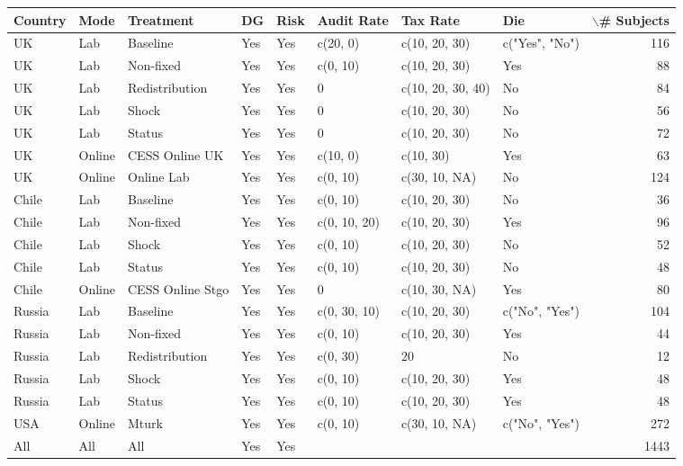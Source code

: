 \begin{tabular}{llllllllr}
  \hline
Country & Mode & Treatment & DG & Risk & Audit Rate & Tax Rate & Die & $\backslash$\# Subjects \\ 
  \hline
UK & Lab & Baseline & Yes & Yes & c(20, 0) & c(10, 20, 30) & c("Yes", "No") & 116 \\ 
  UK & Lab & Non-fixed & Yes & Yes & c(0, 10) & c(10, 20, 30) & Yes &  88 \\ 
  UK & Lab & Redistribution & Yes & Yes & 0 & c(10, 20, 30, 40) & No &  84 \\ 
  UK & Lab & Shock & Yes & Yes & 0 & c(10, 20, 30) & No &  56 \\ 
  UK & Lab & Status & Yes & Yes & 0 & c(10, 20, 30) & No &  72 \\ 
  UK & Online & CESS Online UK & Yes & Yes & c(10, 0) & c(10, 30) & Yes &  63 \\ 
  UK & Online & Online Lab & Yes & Yes & c(0, 10) & c(30, 10, NA) & No & 124 \\ 
  Chile & Lab & Baseline & Yes & Yes & c(0, 10) & c(10, 20, 30) & No &  36 \\ 
  Chile & Lab & Non-fixed & Yes & Yes & c(0, 10, 20) & c(10, 20, 30) & Yes &  96 \\ 
  Chile & Lab & Shock & Yes & Yes & c(0, 10) & c(10, 20, 30) & No &  52 \\ 
  Chile & Lab & Status & Yes & Yes & c(0, 10) & c(10, 20, 30) & No &  48 \\ 
  Chile & Online & CESS Online Stgo & Yes & Yes & 0 & c(10, 30, NA) & Yes &  80 \\ 
  Russia & Lab & Baseline & Yes & Yes & c(0, 30, 10) & c(10, 20, 30) & c("No", "Yes") & 104 \\ 
  Russia & Lab & Non-fixed & Yes & Yes & c(0, 10) & c(10, 20, 30) & Yes &  44 \\ 
  Russia & Lab & Redistribution & Yes & Yes & c(0, 30) & 20 & No &  12 \\ 
  Russia & Lab & Shock & Yes & Yes & c(0, 10) & c(10, 20, 30) & Yes &  48 \\ 
  Russia & Lab & Status & Yes & Yes & c(0, 10) & c(10, 20, 30) & Yes &  48 \\ 
  USA & Online & Mturk & Yes & Yes & c(0, 10) & c(30, 10, NA) & c("No", "Yes") & 272 \\ 
  All & All & All & Yes & Yes &  &  &  & 1443 \\ 
   \hline
\end{tabular}
